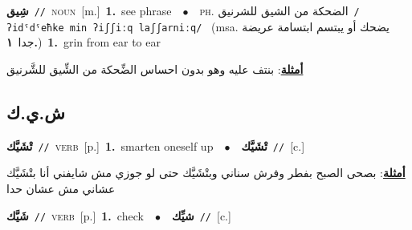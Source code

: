 \documentclass[10pt,a4paper,twoside]{article} %
\begin{document}
\begin{multicols}{2}
{\setlength\topsep{0pt}\textbf{\foreignlanguage{arabic}{شِيق}}\ {\color{gray}\texttt{//}\color{black}}\ \textsc{noun}\ [m.]\ \textbf{1.}~see phrase\ \ $\bullet$\ \ \textsc{ph.} \color{gray} \foreignlanguage{arabic}{الضحكة من الشيق للشرنيق}\color{black}\ {\color{gray}\texttt{/{\sffamily ʔidˤdˤeħke min ʔiʃʃiːq laʃʃarniːq}/}\color{black}}\ \color{gray} (msa. \foreignlanguage{arabic}{يضحك أو يبتسم ابتسامة عريضة جدا}~\foreignlanguage{arabic}{\textbf{١.}})\color{black}\ \textbf{1.}~grin from ear to ear\  \begin{flushright}\color{gray}\foreignlanguage{arabic}{\textbf{\underline{\foreignlanguage{arabic}{أمثلة}}}: بنتف عليه وهو بدون احساس الضِّحكة من الشِّيق للشَّرنيق}\end{flushright}\color{black}} \vspace{2mm}

\vspace{-3mm}
\subsection*{\color{blue}\foreignlanguage{arabic}{ش.ي.ك}\color{blue}{}} 

{\setlength\topsep{0pt}\textbf{\foreignlanguage{arabic}{تْشَيَّك}}\ {\color{gray}\texttt{//}\color{black}}\ \textsc{verb}\ [p.]\ \textbf{1.}~smarten oneself up\ \ $\bullet$\ \ \setlength\topsep{0pt}\textbf{\foreignlanguage{arabic}{تْشَيَّك}}\ {\color{gray}\texttt{//}\color{black}}\ [c.]\  \begin{flushright}\color{gray}\foreignlanguage{arabic}{\textbf{\underline{\foreignlanguage{arabic}{أمثلة}}}: بصحى الصبح بفطر وفرش سناني وبتْشَيَّك حتى لو جوزي مش شايفني أنا بتْشَيَّك عشاني مش عشان حدا}\end{flushright}\color{black}} \vspace{2mm}

{\setlength\topsep{0pt}\textbf{\foreignlanguage{arabic}{شَيَّك}}\ {\color{gray}\texttt{//}\color{black}}\ \textsc{verb}\ [p.]\ \textbf{1.}~check\ \ $\bullet$\ \ \setlength\topsep{0pt}\textbf{\foreignlanguage{arabic}{شيِّك}}\ {\color{gray}\texttt{//}\color{black}}\ [c.]\ } \vspace{2mm}


\end{multicols}
\end{document}
